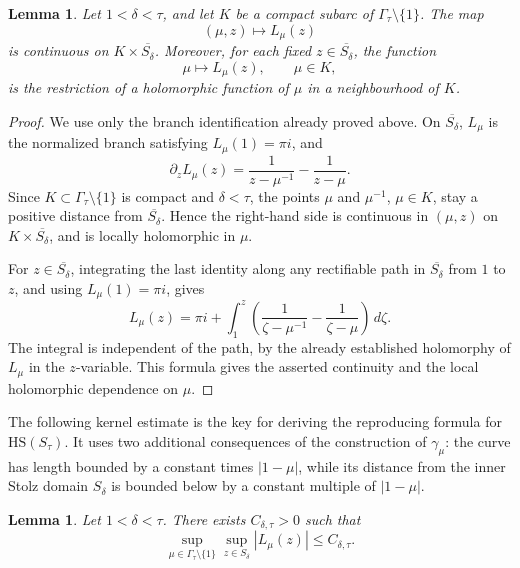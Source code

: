 \documentclass[11pt]{amsart}
\numberwithin{equation}{section}
\newtheorem{lemma}[theorem]{Lemma}
\theoremstyle{definition}
\theoremstyle{plain}
\newcommand{\HS}{\mathrm{HS}}
\begin{document}
\begin{lemma}\label{lem:Lmu-parameter-regularity}
Let \(1<\delta<\tau\), and let \(K\) be a compact subarc of
\(\Gamma_\tau\setminus\{1\}\). 
 The map
\[
        (\mu,z)\mapsto L_\mu(z)
\]
is continuous on \(K\times \overline{S_\delta}\).  Moreover, for each fixed
\(z\in\overline{S_\delta}\), the function
\[
        \mu\mapsto L_\mu(z),\qquad \mu\in K,
\]
is the restriction of a holomorphic function of \(\mu\) in a neighbourhood
of \(K\).
\end{lemma}

\begin{proof}
We use only the branch identification already proved above.  On
\(\overline{S_\delta}\), \(L_\mu\) is the normalized branch satisfying
\(L_\mu(1)=\pi i\), and
\[
        \partial_z L_\mu(z)
        =
        \frac1{z-\mu^{-1}}-\frac1{z-\mu}.
\]
Since \(K\subset\Gamma_\tau\setminus\{1\}\) is compact and \(\delta<\tau\),
the points \(\mu\) and \(\mu^{-1}\), \(\mu\in K\), stay a positive distance
from \(\overline{S_\delta}\).  Hence the right-hand side is continuous in
\((\mu,z)\) on \(K\times\overline{S_\delta}\), and is locally holomorphic in
\(\mu\).

For \(z\in\overline{S_\delta}\), integrating the last identity along any
rectifiable path in \(\overline{S_\delta}\) from \(1\) to \(z\), and using
\(L_\mu(1)=\pi i\), gives
\[
        L_\mu(z)
        =
        \pi i+
        \int_1^z
        \left(
        \frac1{\zeta-\mu^{-1}}-\frac1{\zeta-\mu}
        \right)\,d\zeta .
\]
The integral is independent of the path, by the already established
holomorphy of \(L_\mu\) in the \(z\)-variable.  This formula gives the
asserted continuity and the local holomorphic dependence on \(\mu\).
\end{proof}

The following kernel estimate is the key for deriving the reproducing formula 
for $\HS(S_\tau).$ It uses two additional consequences of the construction of
\(\gamma_\mu\): the curve has length bounded by a constant times \(|1-\mu|\), while its
distance from the inner Stolz domain \(S_\delta\) is bounded below by a
constant multiple of \(|1-\mu|\).

\begin{lemma}\label{lem:Fmu-uniform}
Let \(1<\delta<\tau\).  There exists %
\(C_{\delta,\tau}>0\) such that
\begin{equation}\label{Fmu}
        \sup_{\mu\in\Gamma_\tau\setminus\{1\}}
        \sup_{z\in S_\delta}
        |L_\mu(z)|
        \le
        C_{\delta,\tau}.
\end{equation}
\end{lemma}
\end{document}

